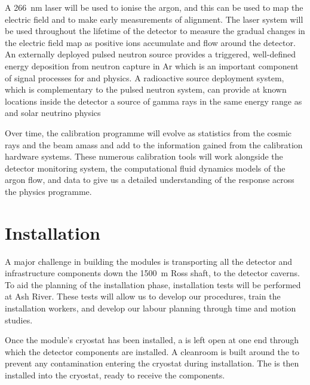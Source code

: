 A \SI{266}{\nano\meter} laser will be used to ionise the argon, and this can be used to map the electric field and to make early measurements of  alignment. The laser system will be used throughout the lifetime of the detector to measure the gradual changes in the electric field map as positive ions accumulate and flow around the detector.
An externally deployed pulsed neutron source provides a triggered, well-defined energy deposition from neutron capture in Ar which is an important component of signal processes for  and  physics. A radioactive source deployment system, which is complementary to the pulsed neutron system, can provide at known locations inside the detector a source of gamma rays in the same energy range as  and solar neutrino physics

Over time, the  calibration programme will evolve as statistics from the cosmic rays and the  beam amass and add to the information gained from the calibration hardware systems. These numerous calibration tools will work alongside the detector monitoring system, the computational fluid dynamics models of the argon flow, and  data to give us a detailed understanding of the  response across the  physics programme.


\section{Installation}

A major challenge in building the   modules is transporting all the detector and infrastructure components down the \SI{1500}{\meter} Ross shaft, to the detector caverns. To aid the planning of the installation phase, installation tests will be performed at Ash River. These tests will allow us to develop our procedures, train the installation workers, and develop our labour planning through time and motion studies.

Once the module's cryostat has been installed, a  is left open at one end through which the detector components are installed. A cleanroom is built around the  to prevent any contamination entering the cryostat during installation. The  is then installed into the cryostat, ready to receive the  components. 

